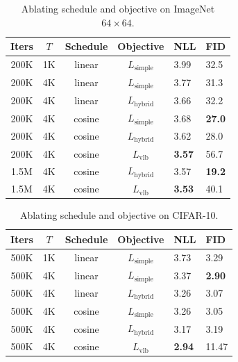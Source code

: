 \documentclass{article}
\begin{document}
\begin{table}[t]
    \caption{\label{tbl:improvementcomparison} Ablating schedule and objective on ImageNet $64 \times 64$.}
    \centering
    \vskip 0.15in
	\begin{center}
	\begin{small}
    \begin{tabular}{ccccll}
    	\toprule
        Iters & $T$ & Schedule & Objective & NLL & FID \\ 
		\midrule
        200K & 1K & linear & $L_{\text{simple}}$ & 3.99 & 32.5 \\
        200K & 4K & linear & $L_{\text{simple}}$ & 3.77 & 31.3 \\
		\midrule
        200K & 4K & linear & $L_{\text{hybrid}}$ & 3.66 & 32.2 \\
        200K & 4K & cosine & $L_{\text{simple}}$ & 3.68 & \bf 27.0 \\
        200K & 4K & cosine & $L_{\text{hybrid}}$ & 3.62 & 28.0 \\
        200K & 4K & cosine & $L_{\text{vlb}}$ & \bf 3.57 & 56.7 \\
        \midrule
        1.5M & 4K & cosine & $L_{\text{hybrid}}$ & 3.57 & \bf 19.2 \\
        1.5M & 4K & cosine & $L_{\text{vlb}}$ & \bf 3.53 & 40.1 \\
        \bottomrule
    \end{tabular}
    \end{small}
    \end{center}
    \vskip -0.1in
\end{table}

\begin{table}[t]
    \caption{\label{tbl:cifar_improvementcomparison} Ablating schedule and objective on CIFAR-10.}
    \centering
    \vskip 0.15in
	\begin{center}
	\begin{small}
    \begin{tabular}{ccccll}
    	\toprule
        Iters & $T$ & Schedule & Objective & NLL & FID \\ 
        \midrule
        500K & 1K & linear & $L_{\text{simple}}$ & 3.73 & 3.29 \\
        500K & 4K & linear & $L_{\text{simple}}$ & 3.37 & \bf 2.90 \\
        \midrule
        500K & 4K & linear & $L_{\text{hybrid}}$ & 3.26 & 3.07 \\
        500K & 4K & cosine & $L_{\text{simple}}$ & 3.26 & 3.05 \\
        500K & 4K & cosine & $L_{\text{hybrid}}$ & 3.17 & 3.19 \\
        500K & 4K & cosine & $L_{\text{vlb}}$ & \bf 2.94 & 11.47 \\
        \bottomrule
    \end{tabular}
    \end{small}
    \end{center}
    \vskip -0.1in
\end{table}
\end{document}
